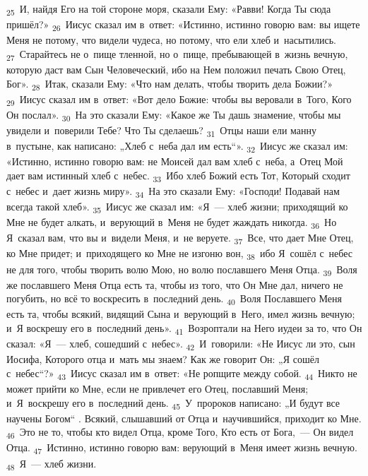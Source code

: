 \documentclass[a4paper,12pt]{article}
\begin{document}
\textsubscript{25}~И, найдя Его на той стороне моря, сказали Ему: «Равви! Когда Ты сюда пришёл?»
\textsubscript{26}~Иисус сказал им в~ответ: «Истинно, истинно говорю вам: вы ищете Меня не потому, что видели чудеса, но потому, что ели хлеб и~насытились.
\textsubscript{27}~Старайтесь не о~пище тленной, но о~пище, пребывающей в~жизнь вечную, которую даст вам Сын Человеческий, ибо на Нем положил печать Свою Отец, Бог».
\textsubscript{28}~Итак, сказали Ему: «Что нам делать, чтобы творить дела Божии?»
\textsubscript{29}~Иисус сказал им в~ответ: «Вот дело Божие: чтобы вы веровали в~Того, Кого Он послал».
\textsubscript{30}~На это сказали Ему: «Какое же Ты дашь знамение, чтобы мы увидели и~поверили Тебе? Что Ты сделаешь?
\textsubscript{31}~Отцы наши ели манну в~пустыне, как написано: „Хлеб с~неба дал им есть“».
\textsubscript{32}~Иисус же сказал им: «Истинно, истинно говорю вам: не Моисей дал вам хлеб с~неба, а~Отец Мой дает вам истинный хлеб с~небес.
\textsubscript{33}~Ибо хлеб Божий есть Тот, Который сходит с~небес и~дает жизнь миру».
\textsubscript{34}~На это сказали Ему: «Господи! Подавай нам всегда такой хлеб».
\textsubscript{35}~Иисус же сказал им: «Я~--- хлеб жизни; приходящий ко Мне не будет алкать, и~верующий в~Меня не будет жаждать никогда.
\textsubscript{36}~Но Я~сказал вам, что вы и~видели Меня, и~не веруете.
\textsubscript{37}~Все, что дает Мне Отец, ко Мне придет; и~приходящего ко Мне не изгоню вон,
\textsubscript{38}~ибо Я~сошёл с~небес не для того, чтобы творить волю Мою, но волю пославшего Меня Отца.
\textsubscript{39}~Воля же пославшего Меня Отца есть та, чтобы из того, что Он Мне дал, ничего не погубить, но всё то воскресить в~последний день.
\textsubscript{40}~Воля Пославшего Меня есть та, чтобы всякий, видящий Сына и~верующий в~Него, имел жизнь вечную; и~Я воскрешу его в~последний день».
\textsubscript{41}~Возроптали на Него иудеи за то, что Он сказал: «Я~--- хлеб, сошедший с~небес».
\textsubscript{42}~И~говорили: «Не Иисус ли это, сын Иосифа, Которого отца и~мать мы знаем? Как же говорит Он: „Я сошёл с~небес“?»
\textsubscript{43}~Иисус сказал им в~ответ: «Не ропщите между собой.
\textsubscript{44}~Никто не может прийти ко Мне, если не привлечет его Отец, пославший Меня; и~Я~воскрешу его в~последний день.
\textsubscript{45}~У~пророков написано: „И будут все научены Богом“ . Всякий, слышавший от Отца и~научившийся, приходит ко Мне.
\textsubscript{46}~Это не то, чтобы кто видел Отца, кроме Того, Кто есть от Бога,~--- Он видел Отца.
\textsubscript{47}~Истинно, истинно говорю вам: верующий в~Меня имеет жизнь вечную.
\textsubscript{48}~Я~— хлеб жизни.
\end{document}
